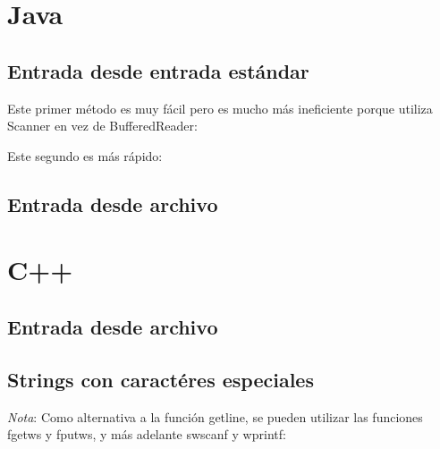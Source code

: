 \documentclass[10pt,letterpaper]{article}
\begin{document}
\section{Java}
\subsection{Entrada desde entrada estándar}
Este primer método es muy fácil pero es mucho más ineficiente porque utiliza Scanner en vez de BufferedReader: \\

\bigskip

Este segundo es más rápido: \\
\subsection{Entrada desde archivo}

\section{C++}
\subsection{Entrada desde archivo}

\subsection{Strings con caractéres especiales}

\emph{Nota}: Como alternativa a la función getline, se pueden utilizar las funciones fgetws y fputws, y más adelante swscanf y wprintf:
\end{document}
